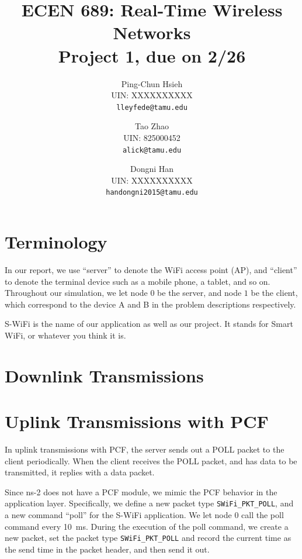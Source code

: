 \documentclass{article}
\begin{document}
\title{ECEN 689: Real-Time Wireless Networks\\ Project 1, due on 2/26}
\date{}
\author{%
Ping-Chun Hsieh\\
UIN: XXXXXXXXXX\\
\texttt{lleyfede@tamu.edu}
\and
Tao Zhao\\
UIN: 825000452\\
\texttt{alick@tamu.edu}
\and
Dongni Han\\
UIN: XXXXXXXXXX\\
\texttt{handongni2015@tamu.edu}
}
\maketitle

\section*{Terminology}

In our report, we use ``server'' to denote the WiFi access point (AP), and
``client'' to denote the terminal device such as a mobile phone, a tablet, and
so on. Throughout our simulation, we let node $0$ be the server, and node $1$ be
the client, which correspond to the device A and B in the problem descriptions
respectively.

S-WiFi is the name of our application as well as our project. It stands for
Smart WiFi, or whatever you think it is.

\section{Downlink Transmissions}

\section{Uplink Transmissions with PCF}
In uplink transmissions with PCF, the server sends out a POLL packet to
the client periodically. When the client receives the POLL packet, and has data
to be transmitted, it replies with a data packet.

Since ns-2 does not have a PCF module, we mimic the PCF behavior in the
application layer. Specifically, we define a new packet type
\lstinline|SWiFi_PKT_POLL|, and a new command ``poll'' for the S-WiFi
application. We let node 0 call the poll command every \SI{10}{ms}.
During the execution of the poll command, we create a new packet, set the packet
type \lstinline|SWiFi_PKT_POLL| and record the current time as the send time in
the packet header, and then send it out.
\end{document}
